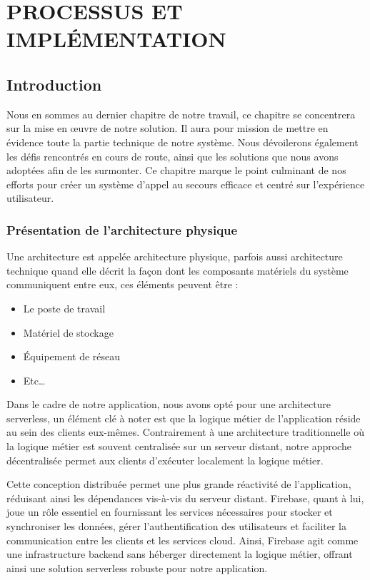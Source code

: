 \chapter{PROCESSUS ET IMPLÉMENTATION}
\justifying
\setlength{\parindent}{2.5em}

\section{Introduction}
Nous en sommes au dernier chapitre de notre travail, ce chapitre se concentrera sur la mise en œuvre de notre solution. Il aura pour mission de mettre en évidence toute la partie technique de notre système. Nous dévoilerons également les défis rencontrés en cours de route, ainsi que les solutions que nous avons adoptées afin de les surmonter. Ce chapitre marque le point culminant de nos efforts pour créer un système d'appel au secours efficace et centré sur l'expérience utilisateur.

\subsection{Présentation de l'architecture physique}
Une architecture est appelée architecture physique, parfois aussi architecture technique quand elle décrit la façon dont les composants matériels du système communiquent entre eux, ces éléments peuvent être : 

\begin{itemize}
	\item Le poste de travail
	\item Matériel de stockage
	\item Équipement de réseau
	\item Etc…
\end{itemize}

Dans le cadre de notre application, nous avons opté pour une architecture serverless, un élément clé à noter est que la logique métier de l'application réside au sein des clients eux-mêmes. Contrairement à une architecture traditionnelle où la logique métier est souvent centralisée sur un serveur distant, notre approche décentralisée permet aux clients d'exécuter localement la logique métier. 

Cette conception distribuée permet une plus grande réactivité de l'application, réduisant ainsi les dépendances vis-à-vis du serveur distant. Firebase, quant à lui, joue un rôle essentiel en fournissant les services nécessaires pour stocker et synchroniser les données, gérer l'authentification des utilisateurs et faciliter la communication entre les clients et les services cloud. Ainsi, Firebase agit comme une infrastructure backend sans héberger directement la logique métier, offrant ainsi une solution serverless robuste pour notre application.

